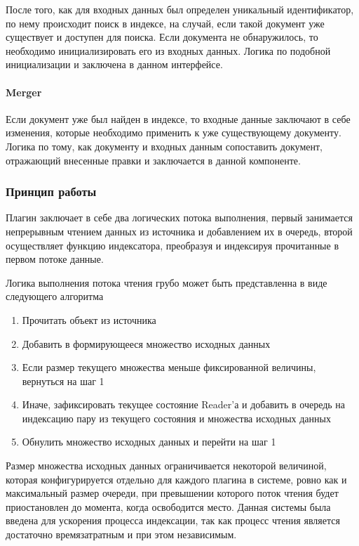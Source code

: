После того, как для входных данных был определен уникальный идентификатор, по нему происходит поиск в индексе, на случай, если такой документ уже существует и доступен для поиска. Если документа не обнаружилось, то необходимо инициализировать его из входных данных. Логика по подобной инициализации и заключена в данном интерфейсе.

\paragraph{Merger}

Если документ уже был найден в индексе, то входные данные заключают в себе изменения, которые необходимо применить к уже существующему документу. Логика по тому, как документу и входных данным сопоставить документ, отражающий внесенные правки и заключается в данной компоненте. 

\subsubsection{Принцип работы}

Плагин заключает в себе два логических потока выполнения, первый занимается непрерывным чтением данных из источника и добавлением их в очередь, второй осуществляет функцию индексатора, преобразуя и индексируя прочитанные в первом потоке данные.

Логика выполнения потока чтения грубо может быть представленна в виде следующего алгоритма

\begin{enumerate}
	\item Прочитать объект из источника
	\item Добавить в формирующееся множество исходных данных
	\item Если размер текущего множества меньше фиксированной величины, вернуться на шаг 1
	\item Иначе, зафиксировать текущее состояние Reader'а и добавить в очередь на индексацию пару из текущего состояния и множества исходных данных
	\item Обнулить множество исходных данных и перейти на шаг 1
\end{enumerate}

Размер множества исходных данных ограничивается некоторой величиной, которая конфигурируется отдельно для каждого плагина в системе, ровно как и максимальный размер очереди, при превышении которого поток чтения будет приостановлен до момента, когда освободится место. Данная системы была введена для ускорения процесса индексации, так как процесс чтения является достаточно времязатратным и при этом независимым.

